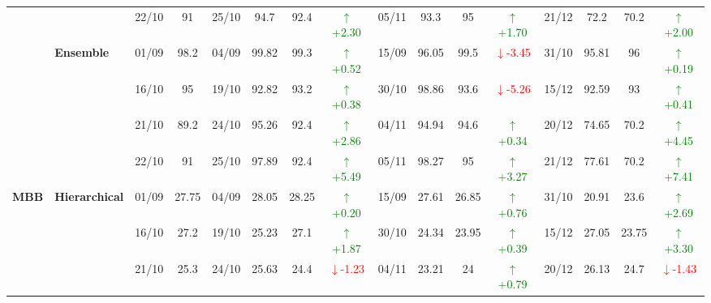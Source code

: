 \documentclass{ieeeaccess}
\begin{document}
{\begin{longtable}{llcc|cccc|cccc|cccc}
&
& 22/10 & 91 & 25/10 & 94.7 & 92.4 & \textcolor{green}{\(\uparrow\)+2.30} & 05/11 & 93.3 & 95 & \textcolor{green}{\(\uparrow\)+1.70} & 21/12 & 72.2 & 70.2 & \textcolor{green}{\(\uparrow\)+2.00} \\
\cmidrule(lr){2-16}


& \textbf{Ensemble}
& 01/09 & 98.2 & 04/09 & 99.82 & 99.3 & \textcolor{green}{\(\uparrow\)+0.52} & 15/09 & 96.05 & 99.5 & \textcolor{red}{\(\downarrow\)-3.45} & 31/10 & 95.81 & 96 & \textcolor{green}{\(\uparrow\)+0.19} \\

&
& 16/10 & 95 & 19/10 & 92.82 & 93.2 & \textcolor{green}{\(\uparrow\)+0.38} & 30/10 & 98.86 & 93.6 & \textcolor{red}{\(\downarrow\)-5.26} & 15/12 & 92.59 & 93 & \textcolor{green}{\(\uparrow\)+0.41} \\

&
& 21/10 & 89.2 & 24/10 & 95.26 & 92.4 & \textcolor{green}{\(\uparrow\)+2.86} & 04/11 & 94.94 & 94.6 & \textcolor{green}{\(\uparrow\)+0.34} & 20/12 & 74.65 & 70.2 & \textcolor{green}{\(\uparrow\)+4.45} \\

&
& 22/10 & 91 & 25/10 & 97.89 & 92.4 & \textcolor{green}{\(\uparrow\)+5.49} & 05/11 & 98.27 & 95 & \textcolor{green}{\(\uparrow\)+3.27} & 21/12 & 77.61 & 70.2 & \textcolor{green}{\(\uparrow\)+7.41} \\
\midrule



\multirow{12}{*}{\textbf{MBB}} 
& \textbf{Hierarchical}
& 01/09 & 27.75 & 04/09 & 28.05 & 28.25 & \textcolor{green}{\(\uparrow\)+0.20} & 15/09 & 27.61 & 26.85 & \textcolor{green}{\(\uparrow\)+0.76} & 31/10 & 20.91 & 23.6 & \textcolor{green}{\(\uparrow\)+2.69} \\

&
& 16/10 & 27.2 & 19/10 & 25.23 & 27.1 & \textcolor{green}{\(\uparrow\)+1.87} & 30/10 & 24.34 & 23.95 & \textcolor{green}{\(\uparrow\)+0.39} & 15/12 & 27.05 & 23.75 & \textcolor{green}{\(\uparrow\)+3.30} \\

&
& 21/10 & 25.3 & 24/10 & 25.63 & 24.4 & \textcolor{red}{\(\downarrow\)-1.23} & 04/11 & 23.21 & 24 & \textcolor{green}{\(\uparrow\)+0.79} & 20/12 & 26.13 & 24.7 & \textcolor{red}{\(\downarrow\)-1.43} \\


\end{longtable}}
\end{document}
